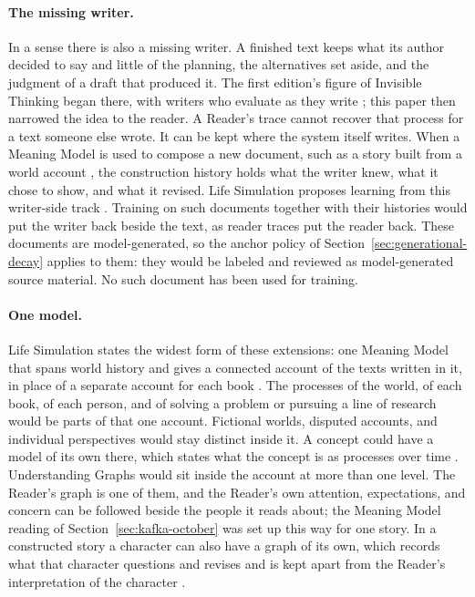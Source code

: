 \documentclass[11pt]{article}
\begin{document}
\paragraph{The missing writer.}\label{sec:missing-writer}
In a sense there is also a missing writer. A finished text keeps what its
author decided to say and little of the planning, the alternatives set aside,
and the judgment of a draft that produced it. The first edition's figure of
Invisible Thinking began there, with writers who evaluate as they write
\cite{westerberg2025superintelligence}; this paper then narrowed the idea to
the reader. A Reader's trace cannot recover that process for a text someone
else wrote. It can be kept where the system itself writes. When a Meaning
Model is used to compose a new document, such as a story built from a world
account \cite{westerbergMeaning2026}, the construction history holds what the
writer knew, what it chose to show, and what it revised. Life Simulation
proposes learning from this writer-side track
\cite{westerbergLifeSimulation2026}. Training on such
documents together with their histories would put the writer back beside the
text, as reader traces put the reader back. These documents are
model-generated, so the anchor policy of Section~\ref{sec:generational-decay}
applies to them: they would be labeled and reviewed as model-generated source
material. No such document has been used for training.

\paragraph{One model.}\label{sec:one-model}
Life Simulation states the widest form of these extensions: one Meaning Model
that spans world history and gives a connected account of the texts written in
it, in place of a separate account for each book
\cite{westerbergLifeSimulation2026}. The processes of the world, of each book,
of each person, and of solving a problem or pursuing a line of research would
be parts of that one account. Fictional worlds, disputed accounts, and
individual perspectives would stay distinct inside it. A concept could have a
model of its own there, which states what the concept is as processes over
time \cite{westerbergMeaning2026}. Understanding Graphs would sit inside the
account at more than one level. The Reader's graph is one of them, and the
Reader's own attention, expectations, and concern can be followed beside the
people it reads about; the Meaning Model reading of
Section~\ref{sec:kafka-october} was set up this way for one story. In a
constructed story a character can also have a graph of its own, which records
what that character questions and revises and is kept apart from the Reader's
interpretation of the character \cite{westerbergLifeSimulation2026}.
\end{document}

